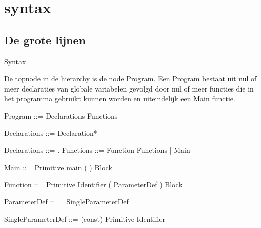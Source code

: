 \chapter{syntax}
\section{De grote lijnen}
Syntax

De topnode in de hierarchy is de node Program. Een Program bestaat uit nul of meer declaraties van globale variabelen gevolgd door nul of meer functies die in het programma gebruikt kunnen worden en uiteindelijk een Main functie.

  Program               ::=     Declarations Functions
  
  Declarations          ::=     Declaration*

  Declarations          ::=
 .
  Functions             ::=     Function Functions                             
                        |       Main                                         
                                                                             
  Main                  ::=     Primitive main ( ) Block                     
                                                                             
  Function              ::=     Primitive Identifier ( ParameterDef ) Block  
                                                                             
  ParameterDef            ::=                                                  
                        |       SingleParameterDef                           
                                                                             
  SingleParameterDef    ::=     (const) Primitive Identifier                 


